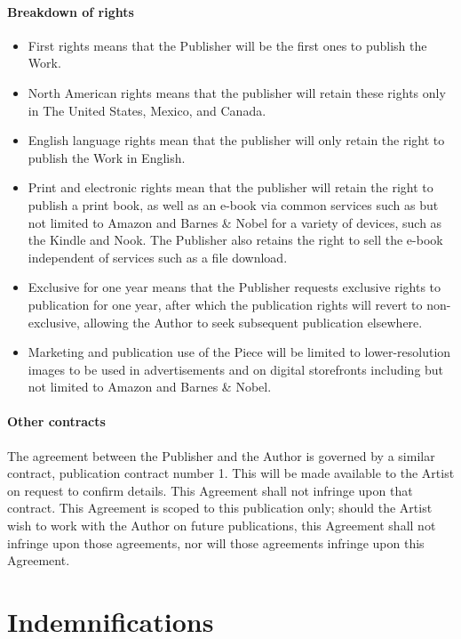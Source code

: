 \documentclass[12pt,letterpaper]{article}
\def\RelatedContract{1}
\begin{document}
\paragraph{Breakdown of rights}

\begin{itemize}
    \item First rights means that the Publisher will be the first ones to publish the Work.
    \item North American rights means that the publisher will retain these rights only in The United States, Mexico, and Canada.
    \item English language rights mean that the publisher will only retain the right to publish the Work in English.
    \item Print and electronic rights mean that the publisher will retain the right to publish a print book, as well as an e-book via common services such as but not limited to Amazon and Barnes \& Nobel for a variety of devices, such as the Kindle and Nook. The Publisher also retains the right to sell the e-book independent of services such as a file download.
    \item Exclusive for one year means that the Publisher requests exclusive rights to publication for one year, after which the publication rights will revert to non-exclusive, allowing the Author to seek subsequent publication elsewhere.
    \item Marketing and publication use of the Piece will be limited to lower-resolution images to be used in advertisements and on digital storefronts including but not limited to Amazon and Barnes \& Nobel.
\end{itemize}

\paragraph{Other contracts}

The agreement between the Publisher and the Author is governed by a similar contract, publication contract number \RelatedContract. This will be made available to the Artist on request to confirm details. This Agreement shall not infringe upon that contract. This Agreement is scoped to this publication only; should the Artist wish to work with the Author on future publications, this Agreement shall not infringe upon those agreements, nor will those agreements infringe upon this Agreement.

\section{Indemnifications}
\end{document}
